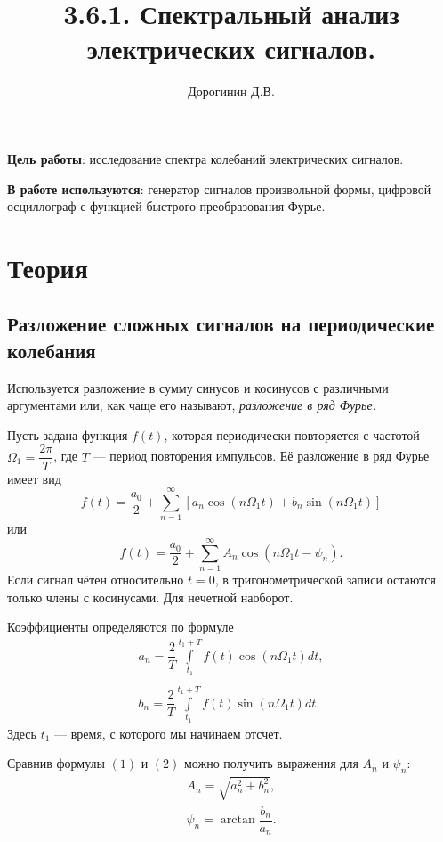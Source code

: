\documentclass[a4paper,12pt]{article}
\author{Дорогинин Д.В.}
\title{3.6.1. Спектральный анализ электрических сигналов.}
\date{}
\begin{document}
\maketitle
\textbf{Цель работы}: 
исследование спектра колебаний электрических сигналов.


\textbf{В работе используются}: генератор сигналов произвольной формы, цифровой осциллограф с функцией быстрого преобразования Фурье.
\section*{Теория}
\subsection*{Разложение сложных сигналов на периодические колебания}
Используется разложение в сумму синусов и косинусов с различными аргументами или, как чаще его называют, \textit{разложение в ряд Фурье}.

Пусть задана функция $f(t)$, которая периодически повторяется с частотой $\Omega_1 = \dfrac{2\pi}{T}$, где $T$ --- период повторения импульсов. Её разложение в ряд Фурье имеет вид 
\begin{equation}
f(t) = \dfrac{a_0}{2} + \sum\limits_{n = 1}^{\infty}\left[a_n \cos \left(n \Omega_1t\right) + b_n \sin \left(n \Omega_1t\right)\right]
\end{equation}
или
\begin{equation}
f(t) = \dfrac{a_0}{2} + \sum\limits_{n = 1}^{\infty}A_n \cos \left(n\Omega_1t-\psi_n\right).
\end{equation}
Если сигнал чётен относительно $t=0$, в тригонометрической записи остаются только члены с косинусами. Для нечетной наоборот.

Коэффициенты определяются по формуле
\begin{equation}
\begin{array}{c}
a_n  = \dfrac{2}{T}\int\limits_{t_1}^{t_1+T}f(t)\cos\left(n \Omega_1 t\right) dt,\\
\\
b_n = \dfrac{2}{T}\int\limits_{t_1}^{t_1+T}f(t)\sin\left(n \Omega_1 t\right) dt.
\end{array}
\end{equation}
Здесь $t_1$ --- время, с которого мы начинаем отсчет.

Сравнив формулы $(1)$ и $(2)$ можно получить выражения для $A_n$  и $\psi_n$:
\begin{equation}
\begin{array}{l}
A_n = \sqrt{a_n^2+b_n^2},\\
 \psi_n = \arctan \dfrac{b_n}{a_n}.
\end{array}
\end{equation}
\end{document}
